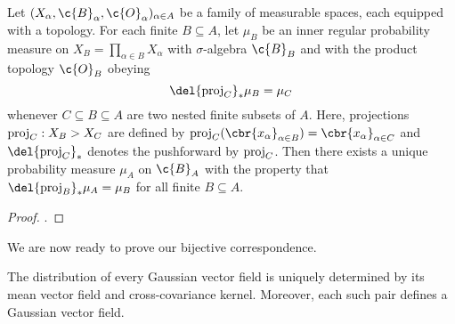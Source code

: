 \documentclass[11pt]{book}
\begin{document}
\begin{result}
Let $(X_\alpha,\c{B}_\alpha,\c{O}_\alpha)_{\alpha\in A}$ be a family of measurable spaces, each equipped with a topology.
For each finite $B \subseteq A$, let $\mu_B$ be an inner regular probability measure on $X_B = \prod_{\alpha\in B} X_\alpha$ with $\sigma$-algebra $\c{B}_B$ and with the product topology $\c{O}_B$ obeying
\[\label{project-measure}
\del{\proj_C}_* \mu_B = \mu_C
\]
whenever $C \subseteq B \subseteq A$ are two nested finite subsets of $A$. 
Here, projections $\operatorname{proj}_C: X_B \-> X_C$ are defined by $\proj_C(\cbr{x_\alpha}_{\alpha \in B}) = \cbr{x_\alpha}_{\alpha \in C}$ and $\del{\proj_C}_*$ denotes the pushforward by $\operatorname{proj}_{C}$.
Then there exists a unique probability measure $\mu_A$ on $\c{B}_A$ with the property that $\del{\proj_B}_* \mu_A = \mu_B$ for all finite $B \subseteq A$.
\end{result}

\begin{proof}
\textcite[Theorem 2.4.3]{tao11}.
\end{proof}

We are now ready to prove our bijective correspondence.

\begin{theorem}
The distribution of every Gaussian vector field is uniquely determined by its mean vector field and cross-covariance kernel.
Moreover, each such pair defines a Gaussian vector field.
\end{theorem}
\end{document}
